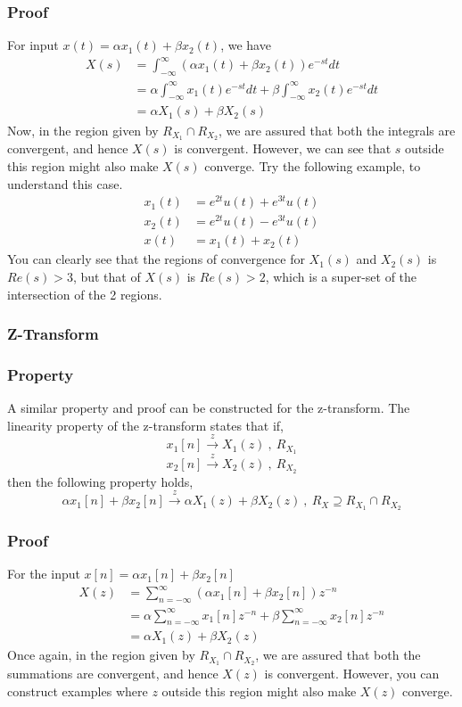 \subsubsection{Proof}
For input $x(t) = \alpha x_1(t) + \beta x_2(t)$, we have 
\begin{align*}
X(s) &= \int_{-\infty}^{\infty}{(\alpha x_1(t) + \beta x_2(t))e^{-st}dt}
\\
&= \alpha \int_{-\infty}^{\infty}{ x_1(t)e^{-st}dt} + \beta \int_{-\infty}^{\infty}{x_2(t)e^{-st}dt}\\
&= \alpha X_1(s) + \beta X_2(s)
\end{align*}
Now, in the region given by $R_{X_1} \cap R_{X_2}$, we are assured that both the integrals are convergent, and hence $X(s)$ is convergent. However, we can see that $s$ outside this region might also make $X(s)$ converge. Try the following example, to understand this case.
\begin{align*}
	x_1(t) &= e^{2t}u(t) + e^{3t}u(t)\\
	x_2(t) &= e^{2t}u(t) - e^{3t}u(t)\\
	x(t) &= x_1(t) + x_2(t)
\end{align*}
You can clearly see that the regions of convergence for $X_1(s)$ and $X_2(s)$ is $Re(s) > 3$, but that of $X(s)$ is $Re(s) > 2$, which is a super-set of the intersection of the 2 regions.
\subsubsection{Z-Transform}
\subsubsection{Property}
A similar property and proof can be constructed for the z-transform. The linearity property of the z-transform states that if,
\[
x_1[n] \xrightarrow{\ z\ } X_1(z)\ ,\ R_{X_1}
\]\[
x_2[n] \xrightarrow{\ z\ } X_2(z)\ ,\ R_{X_2}
\]
then the following property holds,
\[
\alpha x_1[n] + \beta x_2[n] \xrightarrow{\ z\ } \alpha X_1(z) + \beta X_2(z) \ ,\ R_X  \supseteq R_{X_1} \cap R_{X_2}
\]
\subsubsection{Proof}
For the input $x[n] = \alpha x_1[n] + \beta x_2[n]$
\begin{align*}
X(z) &= \sum_{n=-\infty}^{\infty}{(\alpha x_1[n] + \beta x_2[n])z^{-n}}\\
&= \alpha \sum_{n=-\infty}^{\infty}{x_1[n]z^{-n}} + 
\beta \sum_{n=-\infty}^{\infty}{x_2[n]z^{-n}}\\
&= \alpha X_1(z) + \beta X_2(z)
\end{align*}
Once again, in the region given by $R_{X_1} \cap R_{X_2}$, we are assured that both the summations are convergent, and hence $X(z)$ is convergent. However, you can construct examples where $z$ outside this region might also make $X(z)$ converge. 


